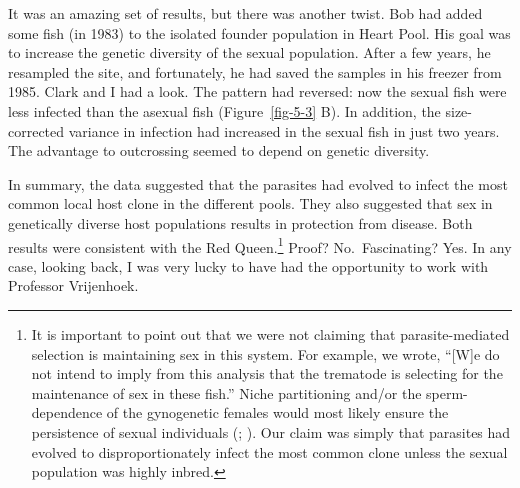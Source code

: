 \documentclass[
  letterpaper,
]{book}
\begin{document}
It was an amazing set of results, but there was another twist. Bob had
added some fish (in 1983) to the isolated founder population in Heart
Pool. His goal was to increase the genetic diversity of the sexual
population. After a few years, he resampled the site, and fortunately,
he had saved the samples in his freezer from 1985. Clark and I had a
look. The pattern had reversed: now the sexual fish were less infected
than the asexual fish (Figure~\ref{fig-5-3} B). In addition, the
size-corrected variance in infection had increased in the sexual fish in
just two years. The advantage to outcrossing seemed to depend on genetic
diversity.

In summary, the data suggested that the parasites had evolved to infect
the most common local host clone in the different pools. They also
suggested that sex in genetically diverse host populations results in
protection from disease. Both results were consistent with the Red
Queen.\footnote{It is important to point out that we were not claiming
  that parasite-mediated selection is maintaining sex in this system.
  For example, we wrote, ``{[}W{]}e do not intend to imply from this
  analysis that the trematode is selecting for the maintenance of sex in
  these fish.'' Niche partitioning and/or the sperm-dependence of the
  gynogenetic females would most likely ensure the persistence of sexual
  individuals (;
  ). Our claim
  was simply that parasites had evolved to disproportionately infect the
  most common clone unless the sexual population was highly inbred.}
Proof? No.~Fascinating? Yes. In any case, looking back, I was very lucky
to have had the opportunity to work with Professor Vrijenhoek.
\end{document}
